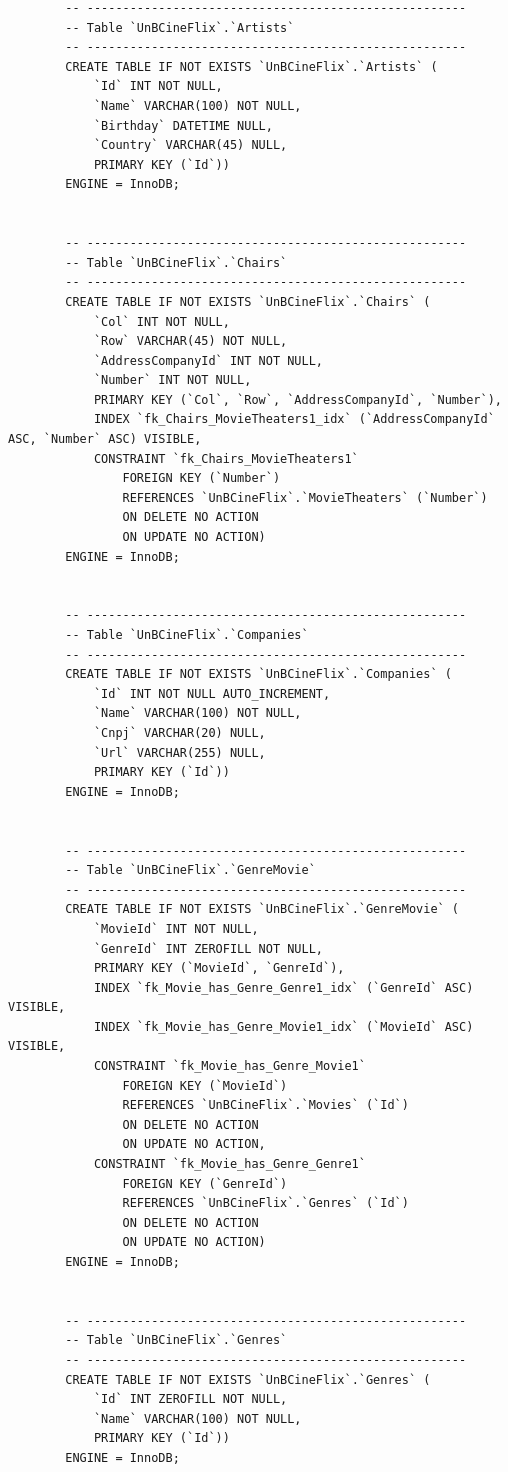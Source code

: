 \documentclass[a4paper,10pt]{article}
\begin{document}
\begin{lstlisting}
		-- -----------------------------------------------------
		-- Table `UnBCineFlix`.`Artists`
		-- -----------------------------------------------------
		CREATE TABLE IF NOT EXISTS `UnBCineFlix`.`Artists` (
			`Id` INT NOT NULL,
			`Name` VARCHAR(100) NOT NULL,
			`Birthday` DATETIME NULL,
			`Country` VARCHAR(45) NULL,
			PRIMARY KEY (`Id`))
		ENGINE = InnoDB;


		-- -----------------------------------------------------
		-- Table `UnBCineFlix`.`Chairs`
		-- -----------------------------------------------------
		CREATE TABLE IF NOT EXISTS `UnBCineFlix`.`Chairs` (
			`Col` INT NOT NULL,
			`Row` VARCHAR(45) NOT NULL,
			`AddressCompanyId` INT NOT NULL,
			`Number` INT NOT NULL,
			PRIMARY KEY (`Col`, `Row`, `AddressCompanyId`, `Number`),
			INDEX `fk_Chairs_MovieTheaters1_idx` (`AddressCompanyId` ASC, `Number` ASC) VISIBLE,
			CONSTRAINT `fk_Chairs_MovieTheaters1`
				FOREIGN KEY (`Number`)
				REFERENCES `UnBCineFlix`.`MovieTheaters` (`Number`)
				ON DELETE NO ACTION
				ON UPDATE NO ACTION)
		ENGINE = InnoDB;


		-- -----------------------------------------------------
		-- Table `UnBCineFlix`.`Companies`
		-- -----------------------------------------------------
		CREATE TABLE IF NOT EXISTS `UnBCineFlix`.`Companies` (
			`Id` INT NOT NULL AUTO_INCREMENT,
			`Name` VARCHAR(100) NOT NULL,
			`Cnpj` VARCHAR(20) NULL,
			`Url` VARCHAR(255) NULL,
			PRIMARY KEY (`Id`))
		ENGINE = InnoDB;


		-- -----------------------------------------------------
		-- Table `UnBCineFlix`.`GenreMovie`
		-- -----------------------------------------------------
		CREATE TABLE IF NOT EXISTS `UnBCineFlix`.`GenreMovie` (
			`MovieId` INT NOT NULL,
			`GenreId` INT ZEROFILL NOT NULL,
			PRIMARY KEY (`MovieId`, `GenreId`),
			INDEX `fk_Movie_has_Genre_Genre1_idx` (`GenreId` ASC) VISIBLE,
			INDEX `fk_Movie_has_Genre_Movie1_idx` (`MovieId` ASC) VISIBLE,
			CONSTRAINT `fk_Movie_has_Genre_Movie1`
				FOREIGN KEY (`MovieId`)
				REFERENCES `UnBCineFlix`.`Movies` (`Id`)
				ON DELETE NO ACTION
				ON UPDATE NO ACTION,
			CONSTRAINT `fk_Movie_has_Genre_Genre1`
				FOREIGN KEY (`GenreId`)
				REFERENCES `UnBCineFlix`.`Genres` (`Id`)
				ON DELETE NO ACTION
				ON UPDATE NO ACTION)
		ENGINE = InnoDB;


		-- -----------------------------------------------------
		-- Table `UnBCineFlix`.`Genres`
		-- -----------------------------------------------------
		CREATE TABLE IF NOT EXISTS `UnBCineFlix`.`Genres` (
			`Id` INT ZEROFILL NOT NULL,
			`Name` VARCHAR(100) NOT NULL,
			PRIMARY KEY (`Id`))
		ENGINE = InnoDB;



\end{lstlisting}
\end{document}
